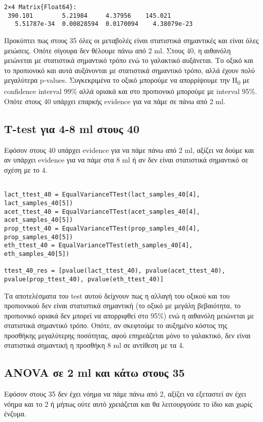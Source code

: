 \documentclass[11pt]{article}
\begin{document}
\begin{verbatim}
2×4 Matrix{Float64}:
 390.101        5.21984     4.37956    145.021
   5.51787e-34  0.00828594  0.0170094    4.38079e-23
\end{verbatim}


Προκύπτει πως στους 35 όλες οι μεταβολές είναι στατιστικά σημαντικές και είναι όλες μειώσεις. Οπότε σίγουρα δεν θέλουμε πάνω από 2 ml. Στους 40, η αιθανόλη μειώνεται με στατιστικά σημαντικό τρόπο ενώ το γαλακτικό αυξάνεται. Το οξικό και το προπιονικό και αυτά αυξάνονται με στατιστικά σημαντικό τρόπο, αλλά έχουν πολύ μεγαλύτερα p-values. Συγκεκριμένα το οξικό μπορούμε να απορρίψουμε την H\textsubscript{0} με confidence interval 99\% αλλά οριακά και στο προπιονικό μπορούμε με interval 95\%. Οπότε στους 40 υπάρχει επαρκής evidence για να πάμε σε πάνω από 2 ml.

\subsection{T-test για 4-8 ml στους 40}
\label{sec:orgd857f53}
Εφόσον στους 40 υπάρχει evidence για να πάμε πάνω από 2 ml, αξίζει να δούμε και αν υπάρχει evidence για να πάμε στα 8 ml ή αν δεν είναι στατιστικά σημαντικό σε σχέση με το 4.

\begin{verbatim}

lact_ttest_40 = EqualVarianceTTest(lact_samples_40[4], lact_samples_40[5])
acet_ttest_40 = EqualVarianceTTest(acet_samples_40[4], acet_samples_40[5])
prop_ttest_40 = EqualVarianceTTest(prop_samples_40[4], prop_samples_40[5])
eth_ttest_40 = EqualVarianceTTest(eth_samples_40[4], eth_samples_40[5])

ttest_40_res = [pvalue(lact_ttest_40), pvalue(acet_ttest_40), pvalue(prop_ttest_40), pvalue(eth_ttest_40)]
\end{verbatim}

Τα αποτελέσματα του test αυτού δείχνουν πως η αλλαγή του οξικού και του προπιονικού δεν είναι στατιστικά σημαντική (το οξικό με μεγάλη βεβαιότητα, το προπιονικό οριακά δεν μπορεί να απορριφθεί στο 95\%) ενώ η αιθανόλη μειώνεται με στατιστικά σημαντικό τρόπο. Οπότε, αν σκεφτούμε το αυξημένο κόστος της προσθήκης μεγαλύτερης ποσότητας, αφού επηρεάζεται μόνο το γαλακτικό, δεν είναι στατιστικά σημαντική η προσθήκη 8 ml σε αντίθεση με τα 4.

\subsection{ANOVA σε 2 ml και κάτω στους 35}
\label{sec:orgd4b94da}
Εφόσον στους 35 δεν έχει νόημα να πάμε πάνω από 2, αξίζει να εξεταστεί αν έχει νόημα και το 2 ή μήπως ούτε αυτό χρειάζεται και θα λειτουργούσε το ίδιο και χωρίς ένζυμα.
\end{document}
